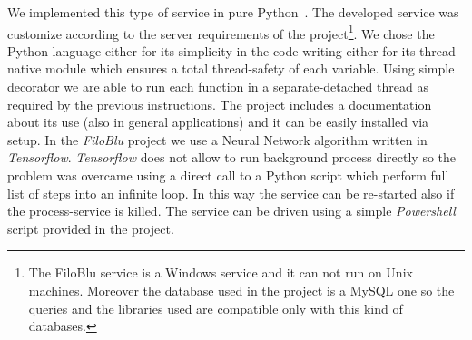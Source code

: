 \documentclass{standalone}
\begin{document}
We implemented this type of service in pure Python~\cite{FiloBlu}.
The developed service was customize according to the server requirements of the project\footnote{
  The FiloBlu service is a Windows service and it can not run on Unix machines.
  Moreover the database used in the project is a MySQL one so the queries and the libraries used are compatible only with this kind of databases.
}.
We chose the Python language either for its simplicity in the code writing either for its thread native module which ensures a total thread-safety of each variable.
Using simple decorator we are able to run each function in a separate-detached thread as required by the previous instructions.
The project includes a documentation about its use (also in general applications) and it can be easily installed via \textsf{setup}.
In the \emph{FiloBlu} project we use a Neural Network algorithm written in \emph{Tensorflow}.
\emph{Tensorflow} does not allow to run background process directly so the problem was overcame using a direct call to a Python script which perform full list of steps into an infinite loop.
In this way the service can be re-started also if the process-service is killed.
The service can be driven using a simple \emph{Powershell} script provided in the project.
\end{document}
